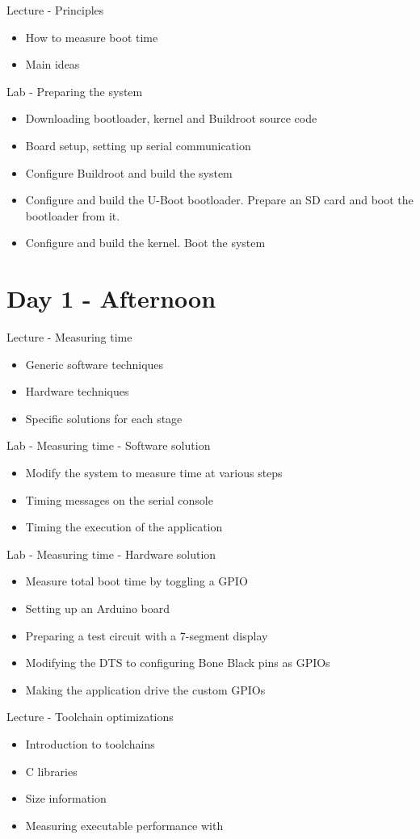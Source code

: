 \documentclass[a4paper,12pt,obeyspaces,spaces,hyphens]{article}
\begin{document}
\feagendatwocolumn
{Lecture - Principles}
{
  \begin{itemize}
  \item How to measure boot time
  \item Main ideas
  \end{itemize}
}
{Lab - Preparing the system}
{
 \begin{itemize}
 \item Downloading bootloader, kernel and Buildroot source code
 \item Board setup, setting up serial communication
 \item Configure Buildroot and build the system
 \item Configure and build the U-Boot bootloader. Prepare an SD card
       and boot the bootloader from it.
 \item Configure and build the kernel. Boot the system
 \end{itemize}
}

\section{Day 1 - Afternoon}

\feagendatwocolumn
{Lecture - Measuring time}
{
  \begin{itemize}
  \item Generic software techniques
  \item Hardware techniques
  \item Specific solutions for each stage
  \end{itemize}
}
{Lab - Measuring time - Software solution}
{
 \begin{itemize}
 \item Modify the system to measure time at various steps
 \item Timing messages on the serial console
 \item Timing the execution of the application
 \end{itemize}
}

\feagendatwocolumn
{Lab - Measuring time - Hardware solution}
{
  \begin{itemize}
  \item Measure total boot time by toggling a GPIO
  \item Setting up an Arduino board
  \item Preparing a test circuit with a 7-segment display
  \item Modifying the DTS to configuring Bone Black pins as GPIOs
  \item Making the application drive the custom GPIOs
  \end{itemize}
}
{Lecture - Toolchain optimizations}
{
  \begin{itemize}
  \item Introduction to toolchains
  \item C libraries
  \item Size information
  \item Measuring executable performance with 
  \end{itemize}
}
\end{document}
